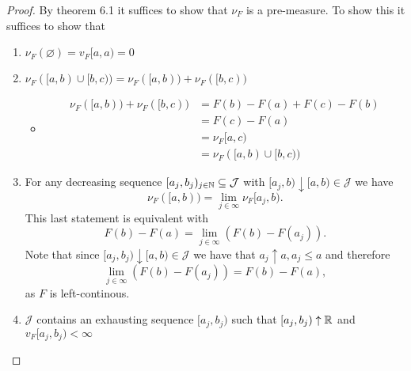 \begin{proof}
By theorem 6.1 it suffices to show that \(\nu _F\) is a pre-measure. To show this it suffices to show that

\begin{enumerate}
  \item \(\nu _F(\varnothing )=v_F[a,a)=0\)
  \item \(\nu _F([a,b)\cup [b,c))=\nu _F([a,b))+\nu _F([b,c))\)
\begin{itemize}
  \item \begin{align*}
\nu _F([a,b))+\nu _F([b,c)) &= F(b)-F(a) + F(c)-F(b) \\
&=F(c)-F(a) \\
&=\nu _F[a,c) \\
&=\nu _F([a,b)\cup [b,c))
\end{align*}
\end{itemize}
  \item For any decreasing sequence \([a_{j},b_{j})_{j\in \Bbb{N}}\subseteq \mathcal{J}\) with \([a_{j},b)\downarrow [a,b)\in \mathcal{J}\) we have
\[
\nu _F([a,b))=\lim_{j\in \infty }\nu _F[a_{j},b).
\]
This last statement is equivalent with
\[
F(b)-F(a)=\lim_{j\in \infty }(F(b)-F(a_{j})).
\]
Note that since \([a_{j},b_{j})\downarrow [a,b)\in \mathcal{J}\) we have that \(a_{j}\uparrow a,a_{j}\leq a\) and therefore
\[
\lim_{j\in \infty }(F(b)-F(a_{j}))=F(b)-F(a),
\]
as \(F\) is left-continous.
  \item \(\mathcal{J}\) contains an exhausting sequence \([a_{j},b_{j})\) such that \([a_{j},b_{j})\uparrow \Bbb{R}\) and \(v_F[a_{j},b_{j})<\infty \)
\end{enumerate}

\end{proof}




